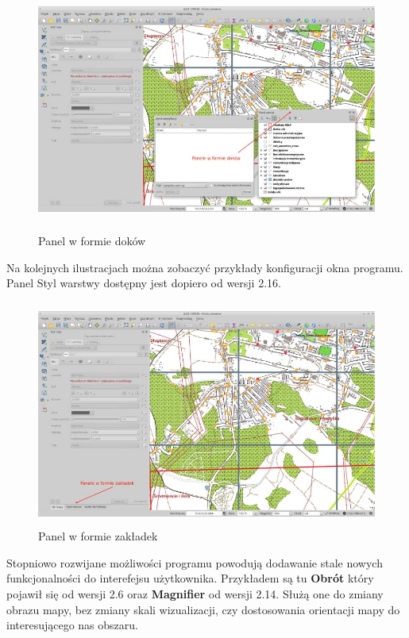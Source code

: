 \documentclass[12pt,a4paper]{book}
\begin{document}
\begin{center}
\begin{figure}
\includegraphics[width=13.219cm,height=8.061cm]{001-panele.png}
\caption{Panel w formie doków}
\end{figure}
\end{center}
Na kolejnych ilustracjach można zobaczyć przykłady konfiguracji okna programu. Panel Styl warstwy dostępny jest dopiero od wersji 2.16.
\begin{center}
\begin{figure}
\includegraphics[width=12.961cm,height=7.426cm]{001-zakladki.jpg}
\caption{Panel w formie zakładek}
\end{figure}
\end{center}
Stopniowo rozwijane możliwości programu powodują dodawanie stale nowych funkcjonalności do interefejsu użytkownika. Przykładem są tu \textbf{Obrót} który pojawił się od wersji 2.6 oraz \textbf{Magnifier} od wersji 2.14. Służą one do zmiany obrazu mapy, bez zmiany skali wizualizacji, czy dostosowania orientacji mapy do interesującego nas obszaru.
\end{document}
